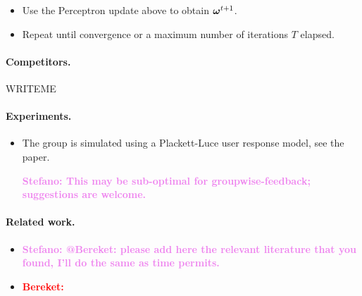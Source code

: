 \documentclass[12pt,a4paper]{article}
\newcommand{\stefano}[1]{{\bf \textcolor{violet}{{Stefano: #1}}}}
\newcommand{\bereket}[1]{{\bf \textcolor{red}{{Bereket: #1}}}}
\begin{document}
\begin{itemize}
\begin{itemize}
                \stefano{@Andrea: maximizing the $\ell_1$ norm over a
                categorical representation is equivalent to requiring that the
                configurations $\vx^1, \ldots, \vx^S$ have a maximal number of
                different attributes; e.g. if $\vx^1$ and $\vx^2$ differ in
                all attributes, regardless of the actual values, they achieve
                maximal $\ell_1$ distance.}

                This can be done \emph{incrementally}: select $\vx^1$ with
                maximal aggregate utility $f$; then, for all $i = 2, \ldots,
                S$, select $\vx^i$ with maximal aggregate utility $f$ and
                diversity from $\vx^1, \ldots, \vx^{i-1}$. This should be
                much faster.

                \stefano{@Andrea, @Bereket: improvements are welcome.}

            \item Use the Perceptron update above to obtain $\boldsymbol{\omega}^{t+1}$.

            \item Repeat until convergence or a maximum number of iterations
                $T$ elapsed.

        \end{itemize}

\end{itemize}

\paragraph{Competitors.}

WRITEME

\paragraph{Experiments.}

\begin{itemize}

    \item The group is simulated using a Plackett-Luce user response model,
        see the paper.

        \stefano{This may be sub-optimal for groupwise-feedback; suggestions
        are welcome.}

\end{itemize}

\paragraph{Related work.}

\begin{itemize}

    \item \stefano{@Bereket: please add here the  relevant literature that
        you found, I'll do the same as time permits.}
    \item \bereket{\cite{boutilier2011preference}}
\end{itemize}



\end{document}
